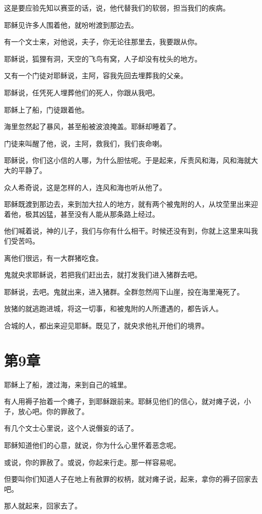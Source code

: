 \documentclass[12pt,oneside]{book}
\begin{document}
这是要应验先知以赛亚的话，说，他代替我们的软弱，担当我们的疾病。

耶稣见许多人围着他，就吩咐渡到那边去。

有一个文士来，对他说，夫子，你无论往那里去，我要跟从你。

耶稣说，狐狸有洞，天空的飞鸟有窝，人子却没有枕头的地方。

又有一个门徒对耶稣说，主阿，容我先回去埋葬我的父亲。

耶稣说，任凭死人埋葬他们的死人，你跟从我吧。

耶稣上了船，门徒跟着他。

海里忽然起了暴风，甚至船被波浪掩盖。耶稣却睡着了。

门徒来叫醒了他，说，主阿，救我们，我们丧命喇。

耶稣说，你们这小信的人哪，为什么胆怯呢。于是起来，斥责风和海，风和海就大大的平静了。

众人希奇说，这是怎样的人，连风和海也听从他了。

耶稣既渡到那边去，来到加大拉人的地方，就有两个被鬼附的人，从坟茔里出来迎着他，极其凶猛，甚至没有人能从那条路上经过。

他们喊着说，神的儿子，我们与你有什么相干。时候还没有到，你就上这里来叫我们受苦吗。

离他们很远，有一大群猪吃食。

鬼就央求耶稣说，若把我们赶出去，就打发我们进入猪群去吧。

耶稣说，去吧。鬼就出来，进入猪群。全群忽然闯下山崖，投在海里淹死了。

放猪的就逃跑进城，将这一切事，和被鬼附的人所遭遇的，都告诉人。

合城的人，都出来迎见耶稣。既见了，就央求他礼开他们的境界。

\chapter{第9章}
耶稣上了船，渡过海，来到自己的城里。

有人用褥子抬着一个瘫子，到耶稣跟前来。耶稣见他们的信心，就对瘫子说，小子，放心吧。你的罪赦了。

有几个文士心里说，这个人说僭妄的话了。

耶稣知道他们的心意，就说，你为什么心里怀着恶念呢。

或说，你的罪赦了。或说，你起来行走。那一样容易呢。

但要叫你们知道人子在地上有赦罪的权柄，就对瘫子说，起来，拿你的褥子回家去吧。

那人就起来，回家去了。
\end{document}
